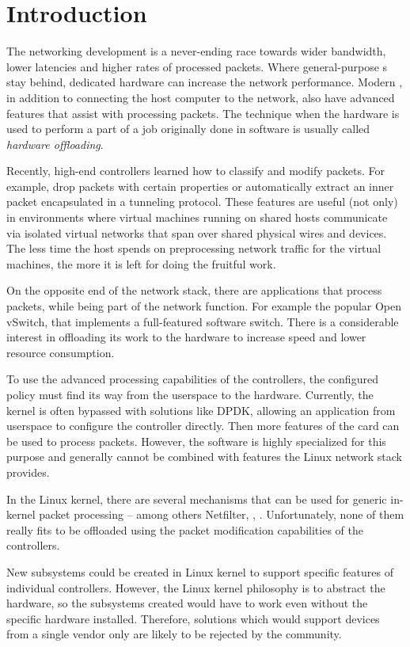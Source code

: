 \chapter{Introduction}

The networking development is a never-ending race towards wider bandwidth,
lower latencies and higher rates of processed packets. Where general-purpose
s stay behind, dedicated hardware can increase the network performance.
Modern , in addition to connecting the host
computer to the network, also have advanced features that assist with
processing packets. The technique when the hardware is used to perform a part of
a job originally done in software is usually called \emph{hardware offloading}.

Recently, high-end controllers learned how to classify and modify packets. For
example, drop packets with certain properties or automatically extract an inner
packet encapsulated in a tunneling protocol. These features are useful (not
only) in environments where virtual machines running on shared hosts communicate via isolated
virtual networks that span over shared physical wires and devices. The less time the
host spends on preprocessing network traffic for the virtual machines, the more
it is left for doing the fruitful work.

On the opposite end of the network stack, there are applications that process
packets, while being part of the network function. For example the popular
Open vSwitch, that implements a full-featured software switch. There is
a considerable interest in offloading its work to the hardware to increase
speed and lower resource consumption.

To use the advanced processing capabilities of the controllers, the configured
policy must find its way from the userspace to the hardware. Currently, the
kernel is often bypassed with solutions like \acrfull{DPDK}, allowing an
application from userspace to configure the controller directly. Then more
features of the card can be used to process packets. However, the software is
highly specialized for this purpose and generally cannot be combined with
features the Linux network stack provides.

In the Linux kernel, there are several mechanisms that can be used for generic
in-kernel packet processing -- among others Netfilter, , .
Unfortunately, none of them really fits to be offloaded using the packet
modification capabilities of the controllers.

New subsystems could be created in Linux kernel to support specific features of
individual controllers. However, the Linux kernel philosophy is to abstract the
hardware, so the subsystems created would have to work even without the
specific hardware installed. Therefore, solutions which would support devices
from a single vendor only are likely to be rejected by the community.

